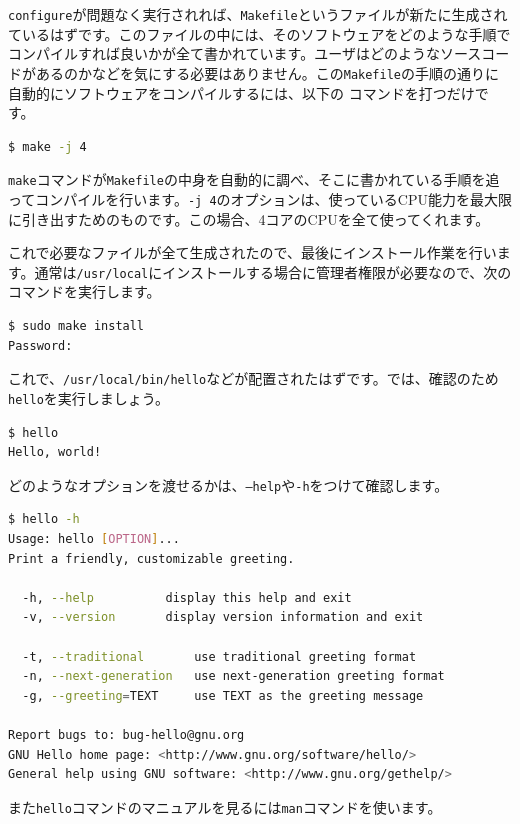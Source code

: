 \texttt{configure}が問題なく実行されれば、\texttt{Makefile}というファイルが新たに生成されているはずです。このファイルの中には、そのソフトウェアをどのような手順でコンパイルすれば良いかが全て書かれています。ユーザはどのようなソースコードがあるのかなどを気にする必要はありません。この\texttt{Makefile}の手順の通りに自動的にソフトウェアをコンパイルするには、以下の
コマンドを打つだけです。

\begin{lstlisting}[language=bash]
$ make -j 4
\end{lstlisting} 

\texttt{make}コマンドが\texttt{Makefile}の中身を自動的に調べ、そこに書かれている手順を追ってコンパイルを行います。\texttt{-j 4}のオプションは、使っているCPU能力を最大限に引き出すためのものです。この場合、4コアのCPUを全て使ってくれます。

これで必要なファイルが全て生成されたので、最後にインストール作業を行います。通常は\texttt{/usr/local}にインストールする場合に管理者権限が必要なので、次のコマンドを実行します。

\begin{lstlisting}[language=bash]
$ sudo make install
Password:
\end{lstlisting}

これで、\texttt{/usr/local/bin/hello}などが配置されたはずです。では、確認のため\texttt{hello}を実行しましょう。 
\begin{lstlisting}[language=bash]
$ hello
Hello, world!
\end{lstlisting}

どのようなオプションを渡せるかは、\texttt{--help}や\texttt{-h}をつけて確認します。
\begin{lstlisting}[language=bash]
$ hello -h
Usage: hello [OPTION]...
Print a friendly, customizable greeting.

  -h, --help          display this help and exit
  -v, --version       display version information and exit

  -t, --traditional       use traditional greeting format
  -n, --next-generation   use next-generation greeting format
  -g, --greeting=TEXT     use TEXT as the greeting message

Report bugs to: bug-hello@gnu.org
GNU Hello home page: <http://www.gnu.org/software/hello/>
General help using GNU software: <http://www.gnu.org/gethelp/>
\end{lstlisting}

また\texttt{hello}コマンドのマニュアルを見るには\texttt{man}コマンドを使います。

